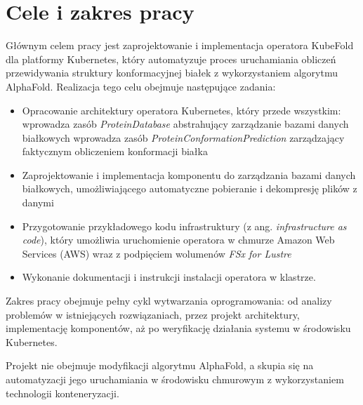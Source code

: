 \section{Cele i zakres pracy}

Głównym celem pracy jest zaprojektowanie i implementacja operatora KubeFold dla platformy Kubernetes, który automatyzuje proces uruchamiania obliczeń przewidywania struktury konformacyjnej białek z wykorzystaniem algorytmu AlphaFold.
Realizacja tego celu obejmuje następujące zadania:

\begin{itemize}
    \item Opracowanie architektury operatora Kubernetes, który przede wszystkim:
    \subitem wprowadza zasób \textit{ProteinDatabase} abstrahujący zarządzanie bazami danych białkowych
    \subitem wprowadza zasób \textit{ProteinConformationPrediction} zarządzający faktycznym obliczeniem konformacji białka
    \item Zaprojektowanie i implementacja komponentu do zarządzania bazami danych białkowych, umożliwiającego automatyczne pobieranie i dekompresję plików z danymi
    \item Przygotowanie przykładowego kodu infrastruktury (z ang. \textit{infrastructure as code}), który umożliwia uruchomienie operatora w chmurze Amazon Web Services (AWS) wraz z podpięciem wolumenów \textit{FSx for Lustre}
    \item Wykonanie dokumentacji i instrukcji instalacji operatora w klastrze.
\end{itemize}

Zakres pracy obejmuje pełny cykl wytwarzania oprogramowania: od analizy problemów w istniejących rozwiązaniach, przez projekt architektury, implementację komponentów, aż po weryfikację działania systemu w środowisku Kubernetes.

Projekt nie obejmuje modyfikacji algorytmu AlphaFold, a skupia się na automatyzacji jego uruchamiania w środowisku chmurowym z wykorzystaniem technologii konteneryzacji.

